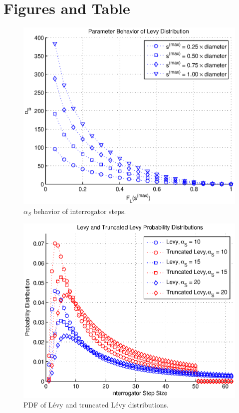 \section{Figures and Table}
\clearpage

\begin{figure}
\centering
\includegraphics[width=5in]{Chapter_4_Figures/alpha_S.eps}
\caption{$\alpha_S$ behavior of interrogator steps.}
\label{Figure: alpha_S.eps}
\end{figure}
\begin{figure}
\centering
\includegraphics[width=5in]{Chapter_4_Figures/pdf_S.eps}
\caption{PDF of L\'{e}vy and truncated L\'{e}vy distributions.}
\label{Figure: pdf_S.eps}
\end{figure}
\clearpage

